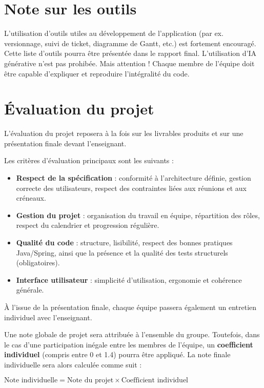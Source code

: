 \documentclass{article}%
\begin{document}

\section{Note sur les outils}

L'utilisation d'outils utiles au développement de l'application (par ex. versionnage, suivi de ticket, diagramme de Gantt, etc.) est fortement encouragé. Cette liste d'outils pourra être présentée dans le rapport final. L'utilisation d'IA générative n'est pas prohibée. Mais attention ! Chaque membre de l'équipe doit être capable d'expliquer et reproduire l'intégralité du code. 


\section{Évaluation du projet}

L'évaluation du projet reposera à la fois sur les livrables produits et sur une présentation finale devant l'enseignant.  

Les critères d'évaluation principaux sont les suivants :  
\begin{itemize}
    \item \textbf{Respect de la spécification} : conformité à l'architecture définie, gestion correcte des utilisateurs, respect des contraintes liées aux réunions et aux créneaux.  
    \item \textbf{Gestion du projet} : organisation du travail en équipe, répartition des rôles, respect du calendrier et progression régulière.  
    \item \textbf{Qualité du code} : structure, lisibilité, respect des bonnes pratiques Java/Spring, ainsi que la présence et la qualité des tests structurels (obligatoires).  
    \item \textbf{Interface utilisateur} : simplicité d'utilisation, ergonomie et cohérence générale.  
\end{itemize}

À l’issue de la présentation finale, chaque équipe passera également un entretien individuel avec l’enseignant.  

Une note globale de projet sera attribuée à l’ensemble du groupe. Toutefois, dans le cas d’une participation inégale entre les membres de l’équipe, un \textbf{coefficient individuel} (compris entre 0 et 1.4) pourra être appliqué. La note finale individuelle sera alors calculée comme suit :  
\begin{center}
$\text{Note individuelle} = \text{Note du projet} \times \text{Coefficient individuel}$
\end{center}
\end{document}
